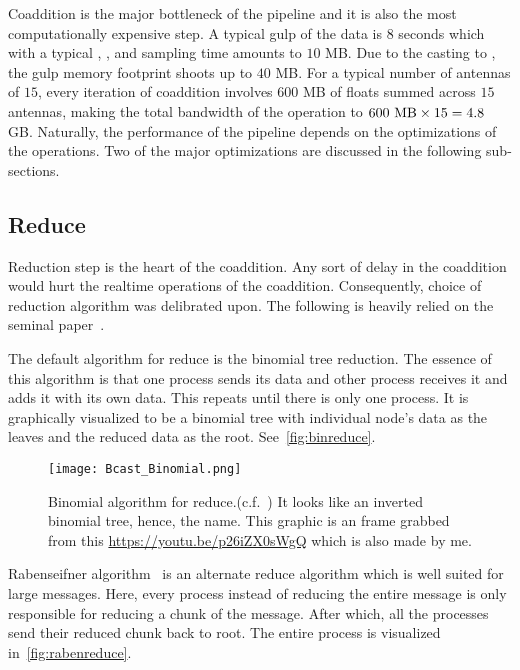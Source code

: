 \par Coaddition is the major bottleneck of the pipeline and it is also the most computationally expensive step. 
A typical gulp of the data is $8$ seconds which with a typical , , and sampling time amounts to $10$ MB.
Due to the casting to \float, the gulp memory footprint shoots up to $40$ MB.
For a typical number of antennas of $15$, every iteration of coaddition involves $600$ MB of floats summed across $15$ antennas, 
making the total bandwidth of the operation to $600\ {\rm MB} \times 15 = 4.8$ GB.
Naturally, the performance of the pipeline depends on the optimizations of the \mpi operations.
Two of the major optimizations are discussed in the following sub-sections.

\subsection {Reduce}
\label{ssub:reduce}

\par Reduction step is the heart of the coaddition. 
Any sort of delay in the coaddition would hurt the realtime operations of the coaddition. 
Consequently, choice of reduction algorithm was delibrated upon.
The following is heavily relied on the seminal paper~\cite{raben}.

\par The default \mpi algorithm for reduce is the binomial tree reduction. 
The essence of this algorithm is that one process sends its data and other process receives it and adds it with its own data.
This repeats until there is only one process. It is graphically visualized to be a binomial tree with individual node's data as the leaves and the reduced data as the root. 
See~\autoref{fig:binreduce}.

\begin{figure}
	\label{fig:binreduce}
	\centering
	\texttt{[image: Bcast\_Binomial.png]}
	\caption{Binomial algorithm for \mpi reduce.(c.f.~\cite{raben}) It looks like an inverted binomial tree, hence, the name.
		This graphic is an frame grabbed from this \url{https://youtu.be/p26iZX0sWgQ} which is also made by me.
	}
\end{figure}

\par Rabenseifner algorithm~\cite{raben} is an alternate reduce algorithm which is well suited for large messages.
Here, every process instead of reducing the entire message is only responsible for reducing a chunk of the message.
After which, all the processes send their reduced chunk back to root.
The entire process is visualized in~\autoref{fig:rabenreduce}.

